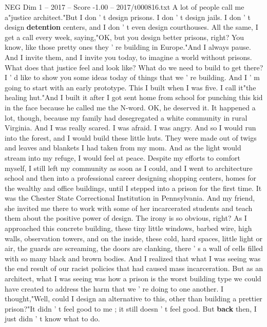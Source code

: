 \begin{textsample}{NEG Dim 1 – 2017 – Score -1.00 – 2017/t000816.txt}  \label{ex:f1_neg_027}
A lot of people call me a"justice architect."But I don ' t design prisons.
I don ' t design jails.
I don ' t design \textbf{detention} centers, and I don ' t even design courthouses.
All the same, I get a call every week, saying,"OK, but you design better prisons, right?
You know, like those pretty ones they ' re building in Europe."And I always pause.
And I invite them, and I invite you today, to imagine a world without prisons.
What does that justice feel and look like?
What do we need to build to get there?
I ' d like to show you some ideas today of things that we ' re building.
And I ' m going to start with an early prototype.
This I built when I was five.
I call it"the healing hut."And I built it after I got sent home from school for punching this kid in the face because he called me the N-word.
OK, he deserved it.
It happened a lot, though, because my family had desegregated a white community in rural Virginia.
And I was really scared.
I was afraid.
I was angry.
And so I would run into the forest, and I would build these little huts.
They were made out of twigs and leaves and blankets I had taken from my mom.
And as the light would stream into my refuge, I would feel at peace.
Despite my efforts to comfort myself, I still left my community as soon as I could, and I went to architecture school and then into a professional career designing shopping centers, homes for the wealthy and office buildings, until I stepped into a prison for the first time.
It was the Chester State Correctional Institution in Pennsylvania.
And my friend, she invited me there to work with some of her incarcerated students and teach them about the positive power of design.
The irony is so obvious, right?
As I approached this concrete building, these tiny little windows, barbed wire, high walls, observation towers, and on the inside, these cold, hard spaces, little light or air, the guards are screaming, the doors are clanking, there ' s a wall of cells filled with so many black and brown bodies.
And I realized that what I was seeing was the end result of our racist policies that had caused mass incarceration.
But as an architect, what I was seeing was how a prison is the worst building type we could have created to address the harm that we ' re doing to one another.
I thought,"Well, could I design an alternative to this, other than building a prettier prison?"It didn ' t feel good to me ; it still doesn ' t feel good.
But \textbf{back} then, I just didn ' t know what to do.

\end{textsample}
